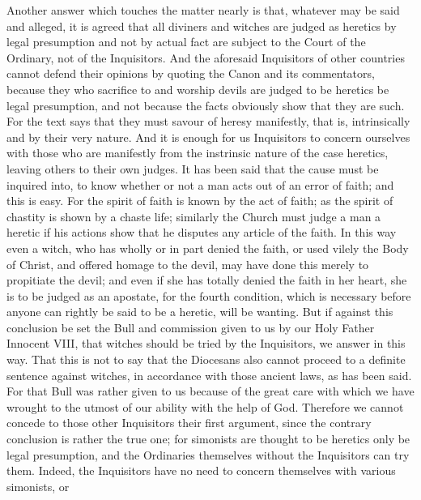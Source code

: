              Another answer which touches the matter nearly is that, whatever may be said and
       alleged, it is agreed that all diviners and witches are judged as heretics by legal presumption
       and not by actual fact are subject to the Court of the Ordinary, not of the Inquisitors. And
       the aforesaid Inquisitors of other countries cannot defend their opinions by quoting the
       Canon and its commentators, because they who sacrifice to and worship devils are judged to
       be heretics be legal presumption, and not because the facts obviously show that they are
       such. For the text says that they must savour of heresy manifestly, that is, intrinsically and
       by their very nature. And it is enough for us Inquisitors to concern ourselves with those who
       are manifestly from the instrinsic nature of the case heretics, leaving others to their own
       judges.
             It has been said that the cause must be inquired into, to know whether or not a man acts
       out of an error of faith; and this is easy. For the spirit of faith is known by the act of faith; as
       the spirit of chastity is shown by a chaste life; similarly the Church must judge a man a
       heretic if his actions show that he disputes any article of the faith. In this way even a witch,
       who has wholly or in part denied the faith, or used vilely the Body of Christ, and offered
       homage to the devil, may have done this merely to propitiate the devil; and even if she has
       totally denied the faith in her heart, she is to be judged as an apostate, for the fourth
       condition, which is necessary before anyone can rightly be said to be a heretic, will be
       wanting.
             But if against this conclusion be set the Bull and commission given to us by our Holy
       Father Innocent VIII, that witches should be tried by the Inquisitors, we answer in this way.
       That this is not to say that the Diocesans also cannot proceed to a definite sentence against
       witches, in accordance with those ancient laws, as has been said. For that Bull was rather
       given to us because of the great care with which we have wrought to the utmost of our
       ability with the help of God.
             Therefore we cannot concede to those other Inquisitors their first argument, since the
       contrary conclusion is rather the true one; for simonists are thought to be heretics only be
       legal presumption, and the Ordinaries themselves without the Inquisitors can try them.
       Indeed, the Inquisitors have no need to concern themselves with various simonists, or
